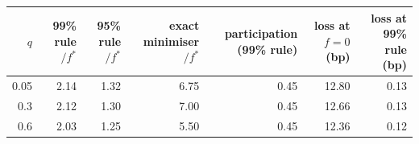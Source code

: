 \begin{tabular}{|r|r|r|r|r|r|r|}
\hline
\rowcolor{gray!15}$q$ & 99\% rule$/f^*$ & 95\% rule$/f^*$ & exact minimiser$/f^*$ & participation (99\% rule) & loss at $f{=}0$ (bp) & loss at 99\% rule (bp) \\
\hline
0.05 & 2.14 & 1.32 & 6.75 & 0.45 & 12.80 & 0.13 \\
\hline
0.3 & 2.12 & 1.30 & 7.00 & 0.45 & 12.66 & 0.13 \\
\hline
0.6 & 2.03 & 1.25 & 5.50 & 0.45 & 12.36 & 0.12 \\
\hline
\end{tabular}
